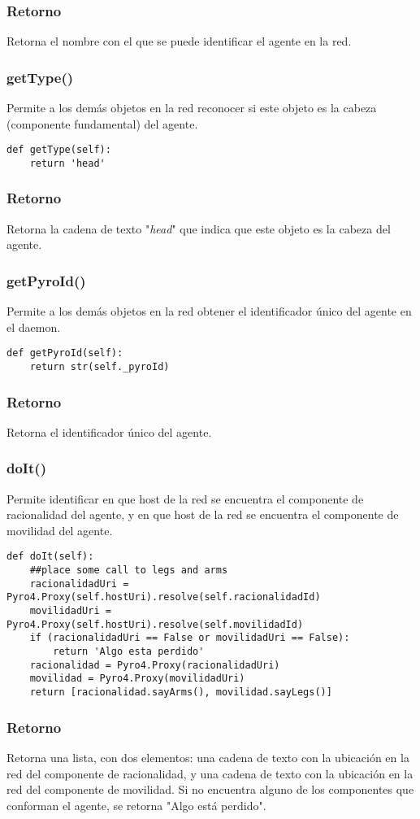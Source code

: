 \documentclass{article}
\begin{document}
\subsubsection*{Retorno}
Retorna el nombre con el que se puede identificar el agente en la red.
\subsubsection{\textbf{getType}()}
Permite a los demás objetos en la red reconocer si este objeto es la cabeza (componente fundamental) del agente.
\begin{lstlisting}
def getType(self):
	return 'head'
\end{lstlisting}
\subsubsection*{Retorno}
Retorna la cadena de texto "\textit{head}" que indica que este objeto es la cabeza del agente.
\subsubsection{\textbf{getPyroId}()}
Permite a los demás objetos en la red obtener el identificador único del agente en el daemon.
\begin{lstlisting}
def getPyroId(self):
	return str(self._pyroId)
\end{lstlisting}
\subsubsection*{Retorno}
Retorna el identificador único del agente.
\subsubsection{\textbf{doIt}()}
Permite identificar en que host de la red se encuentra el componente de racionalidad del agente, y en que host de la red se encuentra el componente de movilidad del agente.
\begin{lstlisting}
def doIt(self):
	##place some call to legs and arms
	racionalidadUri = Pyro4.Proxy(self.hostUri).resolve(self.racionalidadId)
	movilidadUri =  Pyro4.Proxy(self.hostUri).resolve(self.movilidadId)
	if (racionalidadUri == False or movilidadUri == False):
		return 'Algo esta perdido'
	racionalidad = Pyro4.Proxy(racionalidadUri)
	movilidad = Pyro4.Proxy(movilidadUri)
	return [racionalidad.sayArms(), movilidad.sayLegs()]
\end{lstlisting}
\subsubsection*{Retorno}
Retorna una lista, con dos elementos: una cadena de texto con la ubicación en la red del componente de racionalidad, y una cadena de texto con la ubicación en la red del componente de movilidad. Si no encuentra alguno de los componentes que conforman el agente, se retorna "Algo está perdido".
\end{document}
